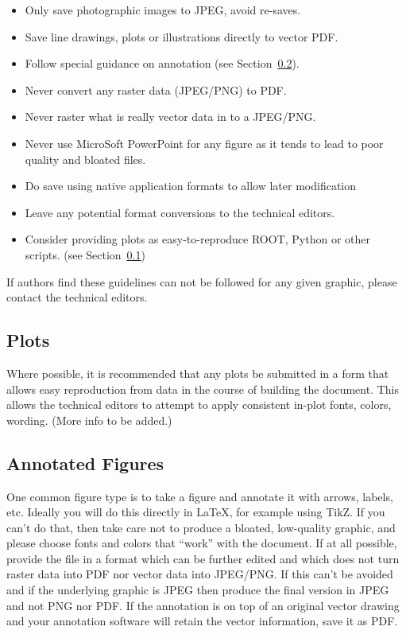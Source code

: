 \begin{itemize}
\item Only save photographic images to JPEG, avoid re-saves.
\item Save line drawings, plots or illustrations directly to vector PDF.
\item Follow special guidance on annotation (see Section~\ref{sec:annotate}).
\item Never convert any raster data (JPEG/PNG) to PDF.
\item Never raster what is really vector data in to a JPEG/PNG.
\item Never use MicroSoft PowerPoint for any figure as it tends to lead to poor quality and bloated files.
\item Do save using native application formats to allow later
  modification
\item Leave any potential format conversions to the technical editors.
\item Consider providing plots as easy-to-reproduce ROOT, Python or
  other scripts.
  (see Section~\ref{sec:plots})
\end{itemize}

\noindent If authors find these guidelines can not be followed for any
given graphic, please contact the technical editors.   

\subsection{Plots}
\label{sec:plots}

Where possible, it is recommended that any plots be submitted in a
form that allows easy reproduction from data in the course of building
the document.
This allows the technical editors to attempt to apply consistent
in-plot fonts, colors, wording.
(More info to be added.)

\subsection{Annotated Figures}
\label{sec:annotate}

One common figure type is to take a figure and annotate it with
arrows, labels, etc.
Ideally you will do this directly in \LaTeX{}, for example using TikZ.
If you can't do that, then take care not to produce a bloated,
low-quality graphic, and please choose fonts and colors that ``work''
with the document.
If at all possible, provide the file in a format which can be further
edited and which does not turn raster data into PDF nor vector data
into JPEG/PNG.
If this can't be avoided and if the underlying graphic is JPEG then
produce the final version in JPEG and not PNG nor PDF.
If the annotation is on top of an original vector drawing and your
annotation software will retain the vector information, save it as
PDF.


